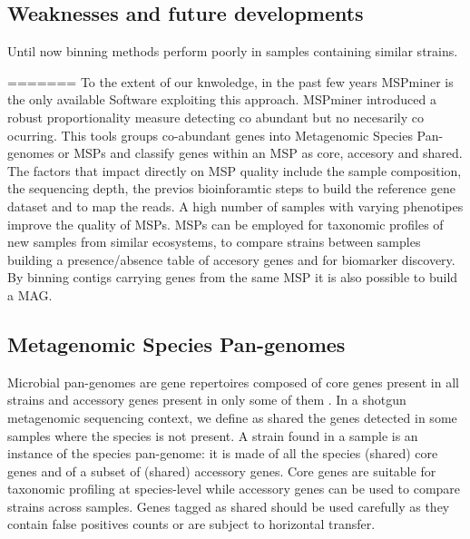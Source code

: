 \documentclass{article}
\begin{document}
\subsection{Weaknesses and future developments}
Until now binning methods perform poorly in samples containing similar strains.

=======
To the extent of our knwoledge, in the past few years MSPminer is the only available Software exploiting this approach. MSPminer introduced a robust proportionality measure detecting co abundant but no necesarily co ocurring. This tools groups co-abundant genes into Metagenomic Species Pan-genomes or \glspl{MSP} and classify genes within an MSP as core, accesory and shared.  
The factors that impact directly on \gls{MSP} quality include the sample composition, the sequencing depth, the previos bioinforamtic steps to build the reference gene dataset and to map the reads.
A high number of samples with varying phenotipes improve the quality of \glspl{MSP}.
MSPs can be employed for taxonomic profiles of new samples from similar ecosystems, to compare strains between samples building a presence/absence table of accesory genes and for biomarker discovery. By binning contigs carrying genes from the same MSP it is also possible to build a \gls{MAG}.

\subsection*{Metagenomic Species Pan-genomes}
Microbial pan-genomes are gene repertoires composed of core genes present in all strains and accessory genes present in only some of them \cite{tettelin2005genome}.
In a shotgun metagenomic sequencing context, we define as shared the genes detected in some samples where the species is not present.
A strain found in a sample is an instance of the species pan-genome: it is made of all the species (shared) core genes and of a subset of (shared) accessory genes.
Core genes are suitable for taxonomic profiling at species-level while accessory genes can be used to compare strains across samples.
Genes tagged as shared should be used carefully as they contain false positives counts or are subject to horizontal transfer.
 
\end{document}
